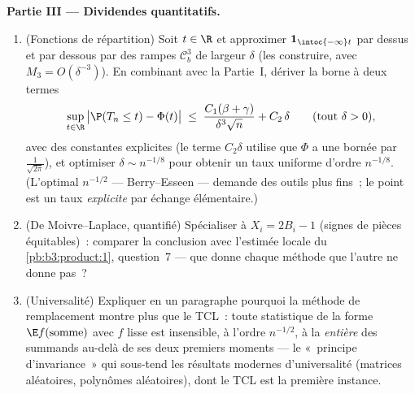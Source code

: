 \begin{problem}
\medskip
\noindent\textbf{Partie III --- Dividendes quantitatifs.}
\begin{enumerate}[resume]
  \item (Fonctions de répartition) Soit $t \in \R$ et
        approximer $\mathbf 1_{\intoc{-\infty}t}$ par
        dessus et par dessous par des rampes $\mathcal
        C^3_b$ de largeur $\delta$ (les construire, avec
        $M_3 = O(\delta^{-3})$). En combinant avec la
        Partie~I, dériver la borne à deux termes
        \[
        \sup_{t\in\R}\,\bigl|\P(T_n \leq t) -
        \Phi(t)\bigr| \;\leq\;
        \frac{C_1(\beta + \gamma)}{\delta^3\sqrt n} +
        C_2\,\delta
        \qquad (\text{tout } \delta > 0),
        \]
        avec des constantes explicites (le terme $C_2\delta$
        utilise que $\Phi$ a une  bornée par
        $\frac1{\sqrt{2\pi}}$), et optimiser $\delta \sim
        n^{-1/8}$ pour obtenir un taux uniforme d'ordre
        $n^{-1/8}$.
        (L'optimal $n^{-1/2}$ --- Berry--Esseen --- demande
        des outils plus fins~; le point est un taux
        \emph{explicite} par échange élémentaire.)
  \item (De Moivre--Laplace, quantifié) Spécialiser à $X_i
        = 2B_i - 1$ (signes de pièces équitables)~: comparer
        la conclusion avec l'estimée locale du
        \cref{pb:b3:product:1}, question~7 --- que donne
        chaque méthode que l'autre ne donne pas~?
  \item (Universalité) Expliquer en un paragraphe pourquoi
        la méthode de remplacement montre plus que le
        TCL~: toute statistique de la forme $\E
        f(\text{somme})$ avec $f$ lisse est insensible, à
        l'ordre $n^{-1/2}$, à la \emph{ entière} des
        summands au-delà de ses deux premiers moments ---
        le «~principe d'invariance~» qui sous-tend les
        résultats modernes d'universalité (matrices
        aléatoires, polynômes aléatoires), dont le TCL est
        la première instance.
\end{enumerate}


\end{problem}
